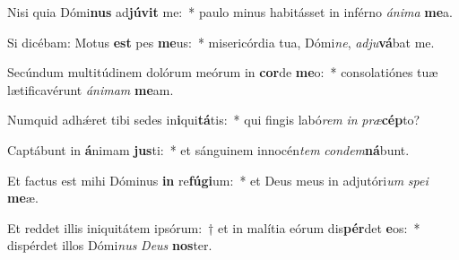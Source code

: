 \item Nisi quia Dómi\textbf{nus} ad\textbf{jú}\textbf{vit} me:~* paulo minus habitásset in inférno \textit{á}\textit{ni}\textit{ma} \textbf{me}a.
\item Si dicébam: Motus \textbf{est} pes \textbf{me}us:~* misericórdia tua, Dómi\textit{ne}, \textit{ad}\textit{ju}\textbf{vá}bat me.
\item Secúndum multitúdinem dolórum meórum in \textbf{cor}de \textbf{me}o:~* consolatiónes tuæ lætificavérunt \textit{á}\textit{ni}\textit{mam} \textbf{me}am.
\item Numquid adhǽret tibi sedes in\textbf{i}qui\textbf{tá}tis:~* qui fingis labó\textit{rem} \textit{in} \textit{præ}\textbf{cép}to?
\item Captábunt in \textbf{á}nimam \textbf{jus}ti:~* et sánguinem innocén\textit{tem} \textit{con}\textit{dem}\textbf{ná}bunt.
\item Et factus est mihi Dóminus \textbf{in} re\textbf{fú}\textbf{gi}um:~* et Deus meus in adjutóri\textit{um} \textit{spe}\textit{i} \textbf{me}æ.
\item Et reddet illis iniquitátem ipsórum:~† et in malítia eórum dis\textbf{pér}det \textbf{e}os:~* dispérdet illos Dómi\textit{nus} \textit{De}\textit{us} \textbf{nos}ter.
